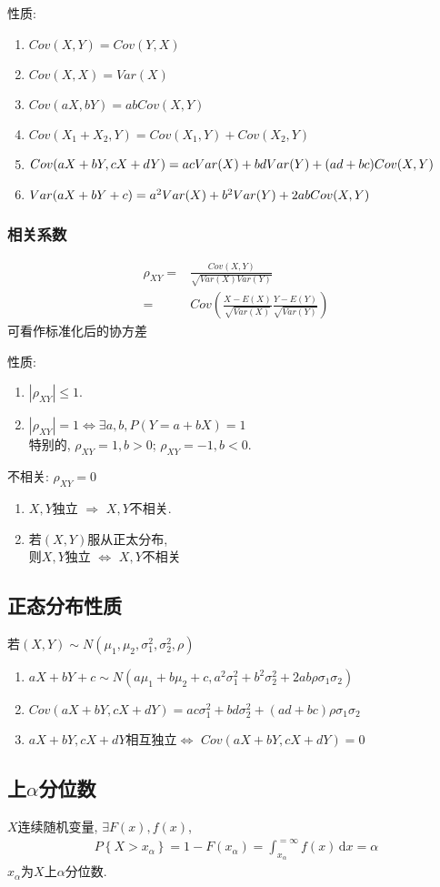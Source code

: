 性质: 
\begin{enumerate}
    \item $Cov(X,Y)=Cov(Y,X)$
    \item $Cov(X,X)=Var(X)$
    \item $Cov(aX,bY)=abCov(X,Y)$
    \item $Cov(X_1+X_2,Y)=Cov(X_1,Y)+Cov(X_2,Y)$
    \item $Cov(aX+bY,cX+dY)=acVar(X)+bdVar(Y)\\+(ad+bc)Cov(X,Y)$
    \item $Var(aX+bY+c)=a^2Var(X)+b^2Var(Y)\\+2abCov(X,Y)$
\end{enumerate}

\subsubsection{相关系数}
\begin{definition}
    \begin{align*}
        \rho_{XY}=&\frac{Cov(X,Y)}{\sqrt{Var(X)Var(Y)}}\\
        =&Cov\left(\frac{X-E(X)}{\sqrt{Var(X)}}\frac{Y-E(Y)}{\sqrt{Var(Y)}}\right)
    \end{align*}
    可看作标准化后的协方差
\end{definition}

性质:
\begin{enumerate}
    \item $|\rho_{XY}|\le 1$. 
    \item $|\rho_{XY}|=1\Longleftrightarrow \exists a,b, P(Y=a+bX)=1$\\
    特别的, $\rho_{XY}=1, b>0$; $\rho_{XY}=-1, b<0$. 
\end{enumerate}

不相关: $\rho_{XY}=0$
\begin{enumerate}
    \item $X,Y$独立 $\Longrightarrow$ $X,Y$不相关.
    \item 若$(X,Y)$服从正太分布, \\ 则$X,Y$独立 $\Longleftrightarrow$ $X,Y$不相关
\end{enumerate}

\subsection{正态分布性质}
若$(X,Y)\sim N(\mu_1,\mu_2,\sigma_1^2,\sigma_2^2,\rho)$
\begin{enumerate}
    \item $aX+bY+c\sim N(a\mu_1+b\mu_2+c,a^2\sigma_1^2+b^2\sigma_2^2+2ab\rho\sigma_1\sigma_2)$
    \item $ Cov(aX+bY,cX+dY)= ac\sigma_1^2+bd\sigma_2^2+(ad+bc)\rho\sigma_1\sigma_2$
    \item $aX+bY, cX+dY$相互独立$\Longleftrightarrow$ $Cov(aX+bY, cX+dY)=0$
\end{enumerate}

\subsection{上\texorpdfstring{$\alpha$}.分位数}
\begin{definition}
    $X$连续随机变量, $\exists F(x), f(x)$, 
    \begin{align*}
        P\left\{X>x_{\alpha}\right\}=1-F(x_{\alpha})=\int_{x_{\alpha}}^{=\infty}f(x)\,\mathrm{d}x=\alpha
    \end{align*}
    $x_{\alpha}$为$X$上$\alpha$分位数. 
\end{definition}